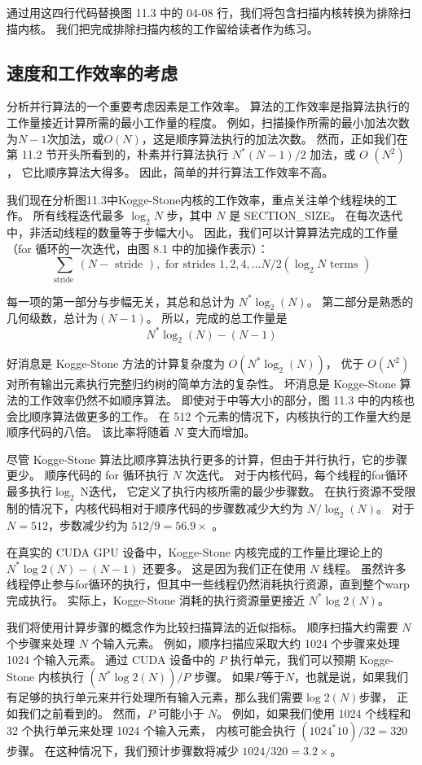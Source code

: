 通过用这四行代码替换图 11.3 中的 04-08 行，我们将包含扫描内核转换为排除扫描内核。 
我们把完成排除扫描内核的工作留给读者作为练习。

\subsection{速度和工作效率的考虑}
分析并行算法的一个重要考虑因素是工作效率。 算法的工作效率是指算法执行的工作量接近计算所需的最小工作量的程度。 
例如，扫描操作所需的最小加法次数为$N-1$次加法，或$O(N)$，这是顺序算法执行的加法次数。 
然而，正如我们在第 11.2 节开头所看到的，朴素并行算法执行 $N^{*}(N-1) / 2$ 加法，或 $O$ $\left(N^{2}\right)$ ，
它比顺序算法大得多。 因此，简单的并行算法工作效率不高。

我们现在分析图11.3中Kogge-Stone内核的工作效率，重点关注单个线程块的工作。 
所有线程迭代最多 $\log _{2} N$ 步，其中 $N$ 是 SECTION\_SIZE。 在每次迭代中，非活动线程的数量等于步幅大小。 
因此，我们可以计算算法完成的工作量（for 循环的一次迭代，由图 8.1 中的加操作表示）：
$$
\sum_{\text {stride }}(N-\text { stride }), \text { for strides } 1,2,4, \ldots N / 2\left(\log_{2} N \text { terms }\right)
$$

每一项的第一部分与步幅无关，其总和总计为 $N^{*} \log _{2}(N)$。 
第二部分是熟悉的几何级数，总计为$(N-1)$。 所以，完成的总工作量是
$$
N^{*} \log _{2}(N)-(N-1)
$$

好消息是 Kogge-Stone 方法的计算复杂度为 $O\left(N^{*} \log _{2}(N)\right)$，
优于 $O\left(N^{ 2}\right)$ 对所有输出元素执行完整归约树的简单方法的复杂性。 
坏消息是 Kogge-Stone 算法的工作效率仍然不如顺序算法。 
即使对于中等大小的部分，图 11.3 中的内核也会比顺序算法做更多的工作。 
在 512 个元素的情况下，内核执行的工作量大约是顺序代码的八倍。 该比率将随着 $N$ 变大而增加。

尽管 Kogge-Stone 算法比顺序算法执行更多的计算，但由于并行执行，它的步骤更少。 
顺序代码的 for 循环执行 $N$ 次迭代。 对于内核代码，每个线程的for循环最多执行$\log _{2} \mathrm{~N}$迭代，
它定义了执行内核所需的最少步骤数。 
在执行资源不受限制的情况下，内核代码相对于顺序代码的步骤数减少大约为 $N / \log _{2}(N)$。 
对于 $N=512$，步数减少约为 $512/9=56.9\times$ 。

在真实的 CUDA GPU 设备中，Kogge-Stone 内核完成的工作量比理论上的 $N^{*} \log 2(N)-(N-1)$ 还要多。 
这是因为我们正在使用 $N$ 线程。 
虽然许多线程停止参与for循环的执行，但其中一些线程仍然消耗执行资源，直到整个warp完成执行。 
实际上，Kogge-Stone 消耗的执行资源量更接近 $N^{*} \log 2(N)$。

我们将使用计算步骤的概念作为比较扫描算法的近似指标。 顺序扫描大约需要 $N$ 个步骤来处理 $N$ 个输入元素。 
例如，顺序扫描应采取大约 1024 个步骤来处理 1024 个输入元素。 
通过 CUDA 设备中的 $P$ 执行单元，我们可以预期 Kogge-Stone 内核执行 $\left(N^{*} \log 2(N)\right) / P$ 步骤。 
如果$P$等于$N$，也就是说，如果我们有足够的执行单元来并行处理所有输入元素，那么我们需要$\log 2(N)$步骤，
正如我们之前看到的。 然而，$P$ 可能小于 $N$。 
例如，如果我们使用 1024 个线程和 32 个执行单元来处理 1024 个输入元素，
内核可能会执行 $\left(1024^{*} 10\right) / 32=320$ 步骤。 
在这种情况下，我们预计步骤数将减少 $1024 / 320=3.2 \times$。

